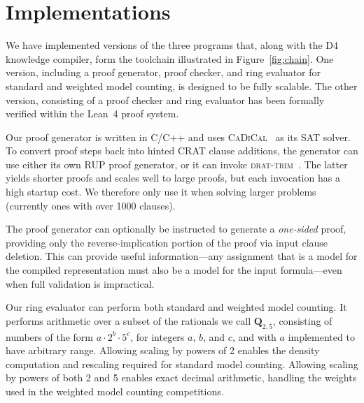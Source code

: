 \documentclass[letterpaper,USenglish,cleveref, autoref, thm-restate]{lipics-v2021}
\newcommand{\drational}{\textbf{Q}_{2,5}}
\newcommand{\progname}[1]{\textsc{#1}}
\newcommand{\dfour}{\progname{D4}}
\newcommand{\cadical}{\progname{CaDiCal}}
\newcommand{\dtrim}{\progname{drat-trim}}
\newcommand{\lean}{Lean~4}
\begin{document}
\section{Implementations}
We have implemented versions of the three programs that, along with the \dfour{} knowledge compiler,  form the
toolchain illustrated in Figure~\ref{fig:chain}.  One version,
including a proof generator, proof checker, and ring evaluator for
standard and weighted model counting, is designed to be fully
scalable.  The other version, consisting of a proof checker and
ring evaluator has been formally verified within the \lean{} proof
system.

Our proof generator is written in C/C++ and uses
\cadical{}~\cite{biere-cadical-2019} as its SAT solver.  To convert
proof steps back into hinted CRAT clause additions, the generator can
use either its own RUP proof generator, or it can invoke
\dtrim{}~\cite{RAT}.  The latter yields shorter proofs and scales well
to large proofs, but each invocation has a high startup cost.  We
therefore only use it when solving larger problems (currently ones
with over 1000 clauses).

The proof generator can optionally be instructed to generate a {\em
one-sided} proof, providing only the reverse-implication portion of the proof via
input clause deletion.  This can provide useful information---any
assignment that is a model for the compiled representation
must also be a model for the input formula---even when
full validation is impractical.

Our ring evaluator can perform both standard and weighted model
counting.  It performs arithmetic over a subset of the rationals
we call $\drational$,
consisting of numbers of the form
$a \cdot 2^{b} \cdot 5^{c}$, for integers $a$, $b$, and $c$, and
with $a$ implemented to have arbitrary range.
Allowing scaling by powers of 2 enables the density computation
and rescaling required for standard model counting.  Allowing scaling
by powers of both 2 and 5 enables exact decimal arithmetic, handling
the weights used in the weighted model counting competitions.
\end{document}
